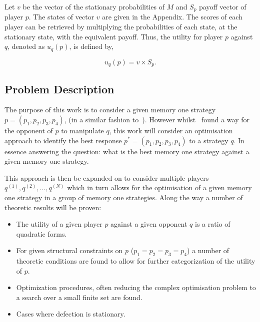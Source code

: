 \documentclass[10pt]{article}
\begin{document}
Let \(v\) be the vector of the stationary probabilities of \(M\) and \(S_p\)
payoff vector of player \(p\). The states of vector \(v\) are given in the
Appendix. The scores of each player can be
retrieved by multiplying the probabilities of each state, at the stationary state,
with the equivalent payoff. Thus, the  utility for player \(p\) against \(q\),
denoted as \(u_q(p)\), is defined by,

\begin{equation}\label{eq:press_dyson_utility}
    u_q(p) = v \times S_p.
\end{equation}

\subsection{Problem Description}

The purpose of this work is to consider a given memory one strategy 
\(p=(p_1, p_2, p_3, p_4)\), (in a similar fashion to~\cite{Press2012}). However
whilst~\cite{Press2012} found a way for the opponent of \(p\) to manipulate 
\(q\), this work will consider an optimisation approach to identify the best 
response \(p^*=(p_1, p_2, p_3, p_4)\) to a strategy \(q\). In essence 
answering the question: what is the best memory one strategy against a given 
memory one strategy.

This approach is then be expanded on to consider multiple players \(q^{(1)},
q^{(2)}, \dots ,q^{(N)}\) which in turn allows for the optimisation  of a given memory
one strategy in a group of memory one strategies. Along the way a number of
theoretic results will be proven:

\begin{itemize}
    \item The utility of a given player \(p\) against a given opponent \(q\) 
    is a ratio of quadratic forms.
    \item For given structural constraints on \(p\) (\(p_1=p_2=p_3=p_4\)) a number
    of theoretic conditions are found to allow for further categorization of the
    utility of \(p\).
    \item Optimization procedures, often reducing the complex optimisation 
    problem to a search over a small finite set are found.
    \item Cases where defection is stationary.
\end{itemize}

\end{document}

